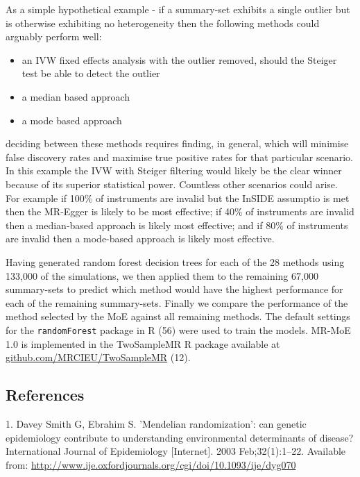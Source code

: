 \documentclass[]{article}
\providecommand{\tightlist}{%
  \setlength{\itemsep}{0pt}\setlength{\parskip}{0pt}}
\begin{document}
As a simple hypothetical example - if a summary-set exhibits a single
outlier but is otherwise exhibiting no heterogeneity then the following
methods could arguably perform well:

\begin{itemize}
\tightlist
\item
  an IVW fixed effects analysis with the outlier removed, should the
  Steiger test be able to detect the outlier
\item
  a median based approach
\item
  a mode based approach
\end{itemize}

deciding between these methods requires finding, in general, which will
minimise false discovery rates and maximise true positive rates for that
particular scenario. In this example the IVW with Steiger filtering
would likely be the clear winner because of its superior statistical
power. Countless other scenarios could arise. For example if 100\% of
instruments are invalid but the InSIDE assumptio is met then the
MR-Egger is likely to be most effective; if 40\% of instruments are
invalid then a median-based approach is likely most effective; and if
80\% of instruments are invalid then a mode-based approach is likely
most effective.

Having generated random forest decision trees for each of the 28 methods
using 133,000 of the simulations, we then applied them to the remaining
67,000 summary-sets to predict which method would have the highest
performance for each of the remaining summary-sets. Finally we compare
the performance of the method selected by the MoE against all remaining
methods. The default settings for the \texttt{randomForest} package in R
(56) were used to train the models. MR-MoE 1.0 is implemented in the
TwoSampleMR R package available at
\href{https://github.com/MRCIEU/TwoSampleMR}{github.com/MRCIEU/TwoSampleMR}
(12).

\subsection{References}\label{references}

\raggedright

\hypertarget{refs}{}
\hypertarget{ref-DaveySmith2003}{}
1. Davey Smith G, Ebrahim S. 'Mendelian randomization': can genetic
epidemiology contribute to understanding environmental determinants of
disease? International Journal of Epidemiology {[}Internet{]}. 2003
Feb;32(1):1--22. Available from:
\url{http://www.ije.oxfordjournals.org/cgi/doi/10.1093/ije/dyg070}
\end{document}
